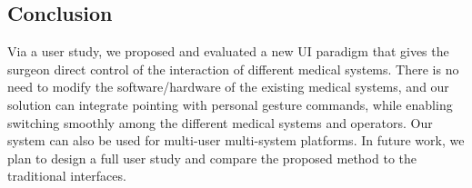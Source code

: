 \subsection{Conclusion}
Via a user study, we proposed and evaluated a new UI paradigm that gives the surgeon direct control of the interaction of different medical systems. There is no need to modify the software/hardware of the existing medical systems, and our solution can integrate pointing with personal gesture commands, while enabling switching smoothly among the different medical systems and operators. Our system can also be used for multi-user multi-system platforms. In future work, we plan to design a full user study and compare the proposed method to the traditional interfaces.